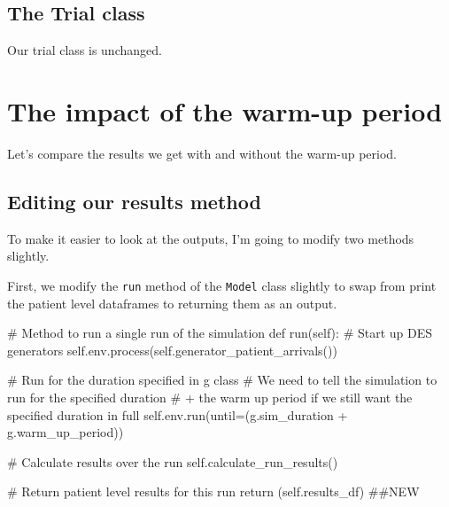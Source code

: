 \documentclass[
  letterpaper,
  DIV=11,
  numbers=noendperiod]{scrreprt}
\newenvironment{Shaded}{\begin{snugshade}}{\end{snugshade}}
\newcommand{\CommentTok}[1]{\textcolor[rgb]{0.37,0.37,0.37}{#1}}
\newcommand{\ControlFlowTok}[1]{\textcolor[rgb]{0.00,0.23,0.31}{#1}}
\newcommand{\KeywordTok}[1]{\textcolor[rgb]{0.00,0.23,0.31}{#1}}
\newcommand{\NormalTok}[1]{\textcolor[rgb]{0.00,0.23,0.31}{#1}}
\newcommand{\OperatorTok}[1]{\textcolor[rgb]{0.37,0.37,0.37}{#1}}
\newcommand{\VariableTok}[1]{\textcolor[rgb]{0.07,0.07,0.07}{#1}}
\begin{document}
\subsection{The Trial class}\label{the-trial-class-2}

Our trial class is unchanged.

\section{The impact of the warm-up
period}\label{the-impact-of-the-warm-up-period}

Let's compare the results we get with and without the warm-up period.

\subsection{Editing our results
method}\label{editing-our-results-method}

To make it easier to look at the outputs, I'm going to modify two
methods slightly.

First, we modify the \texttt{run} method of the \texttt{Model} class
slightly to swap from print the patient level dataframes to returning
them as an output.

\begin{Shaded}
\begin{Highlighting}[]
\CommentTok{\# Method to run a single run of the simulation}
\KeywordTok{def}\NormalTok{ run(}\VariableTok{self}\NormalTok{):}
    \CommentTok{\# Start up DES generators}
    \VariableTok{self}\NormalTok{.env.process(}\VariableTok{self}\NormalTok{.generator\_patient\_arrivals())}

    \CommentTok{\# Run for the duration specified in g class}
    \CommentTok{\# We need to tell the simulation to run for the specified duration}
    \CommentTok{\# + the warm up period if we still want the specified duration in full}
    \VariableTok{self}\NormalTok{.env.run(until}\OperatorTok{=}\NormalTok{(g.sim\_duration }\OperatorTok{+}\NormalTok{ g.warm\_up\_period))}

    \CommentTok{\# Calculate results over the run}
    \VariableTok{self}\NormalTok{.calculate\_run\_results()}

    \CommentTok{\# Return patient level results for this run}
    \ControlFlowTok{return}\NormalTok{ (}\VariableTok{self}\NormalTok{.results\_df) }\CommentTok{\#\#NEW}
\end{Highlighting}
\end{Shaded}
\end{document}
